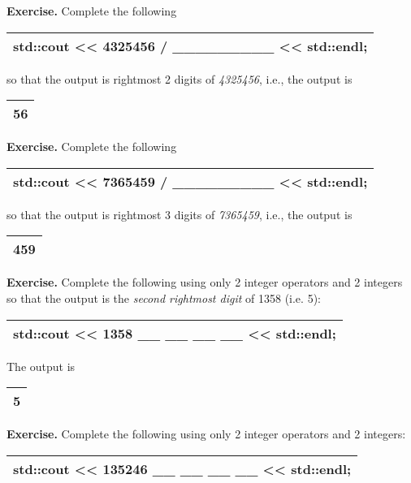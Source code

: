 \documentclass[
]{article}
\begin{document}
\textbf{Exercise.} Complete the following

\begin{longtable}[]{@{}l@{}}
\toprule
\endhead
std::cout \textless\textless{} 4325456 / \_\_\_\_\_\_\_\_\_
\textless\textless{} std::endl;\tabularnewline
\bottomrule
\end{longtable}

so that the output is rightmost 2 digits of \emph{4325456}, i.e., the
output is

\begin{longtable}[]{@{}l@{}}
\toprule
\endhead
56\tabularnewline
\bottomrule
\end{longtable}

\textbf{Exercise.} Complete the following

\begin{longtable}[]{@{}l@{}}
\toprule
\endhead
std::cout \textless\textless{} 7365459 / \_\_\_\_\_\_\_\_\_
\textless\textless{} std::endl;\tabularnewline
\bottomrule
\end{longtable}

so that the output is rightmost 3 digits of \emph{7365459}, i.e., the
output is

\begin{longtable}[]{@{}l@{}}
\toprule
\endhead
459\tabularnewline
\bottomrule
\end{longtable}

\textbf{Exercise.} Complete the following using only 2 integer operators
and 2 integers so that the output is the \emph{second rightmost digit}
of 1358 (i.e. 5):

\begin{longtable}[]{@{}l@{}}
\toprule
\endhead
std::cout \textless\textless{} 1358 \_\_ \_\_ \_\_ \_\_
\textless\textless{} std::endl;\tabularnewline
\bottomrule
\end{longtable}

The output is

\begin{longtable}[]{@{}l@{}}
\toprule
\endhead
5\tabularnewline
\bottomrule
\end{longtable}

\textbf{Exercise.} Complete the following using only 2 integer operators
and 2 integers:

\begin{longtable}[]{@{}l@{}}
\toprule
\endhead
std::cout \textless\textless{} 135246 \_\_ \_\_ \_\_ \_\_
\textless\textless{} std::endl;\tabularnewline
\bottomrule
\end{longtable}
\end{document}

